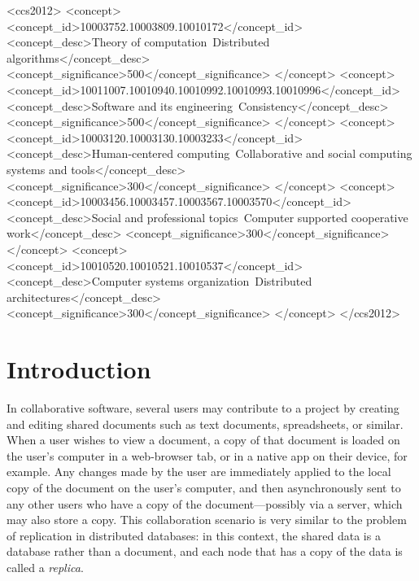 \documentclass[sigconf]{acmart}
\begin{document}
\begin{CCSXML}
<ccs2012>
<concept>
<concept_id>10003752.10003809.10010172</concept_id>
<concept_desc>Theory of computation~Distributed algorithms</concept_desc>
<concept_significance>500</concept_significance>
</concept>
<concept>
<concept_id>10011007.10010940.10010992.10010993.10010996</concept_id>
<concept_desc>Software and its engineering~Consistency</concept_desc>
<concept_significance>500</concept_significance>
</concept>
<concept>
<concept_id>10003120.10003130.10003233</concept_id>
<concept_desc>Human-centered computing~Collaborative and social computing systems and tools</concept_desc>
<concept_significance>300</concept_significance>
</concept>
<concept>
<concept_id>10003456.10003457.10003567.10003570</concept_id>
<concept_desc>Social and professional topics~Computer supported cooperative work</concept_desc>
<concept_significance>300</concept_significance>
</concept>
<concept>
<concept_id>10010520.10010521.10010537</concept_id>
<concept_desc>Computer systems organization~Distributed architectures</concept_desc>
<concept_significance>300</concept_significance>
</concept>
</ccs2012>
\end{CCSXML}


\maketitle

\section{Introduction}

In collaborative software, several users may contribute to a project by creating and editing shared documents such as text documents, spreadsheets, or similar.
When a user wishes to view a document, a copy of that document is loaded on the user's computer in a web-browser tab, or in a native app on their device, for example.
Any changes made by the user are immediately applied to the local copy of the document on the user's computer, and then asynchronously sent to any other users who have a copy of the document---possibly via a server, which may also store a copy.
This collaboration scenario is very similar to the problem of replication in distributed databases: in this context, the shared data is a database rather than a document, and each node that has a copy of the data is called a \emph{replica}.
\end{document}

